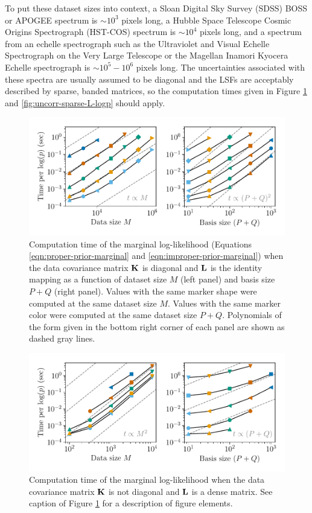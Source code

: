 \documentclass[trackchanges]{aastex62}
\newcommand{\vx}[1]{{\bf {#1}}}
\begin{document}
To put these dataset sizes into context, a Sloan Digital Sky Survey (SDSS) BOSS or APOGEE spectrum is $\sim 10^3$ pixels long, a Hubble Space Telescope Cosmic Origins Spectrograph (HST-COS) spectrum is $\sim 10^4$ pixels long, and a spectrum from an echelle spectrograph such as the Ultraviolet and Visual Echelle Spectrograph on the Very Large Telescope or the Magellan Inamori Kyocera Echelle spectrograph is $\sim 10^5 - 10^6$ pixels long.
The uncertainties associated with these spectra are usually assumed to be diagonal and the LSFs are acceptably described by sparse, banded matrices, so the computation times given in Figure \ref{fig:uncorr-no-L-logp} and \ref{fig:uncorr-sparse-L-logp} should apply.

\begin{figure}
  \includegraphics{uncorr_no_L_scaling.pdf}
  \caption{Computation time of the marginal log-likelihood (Equations \ref{eqn:proper-prior-marginal} and \ref{eqn:improper-prior-marginal}) when the data covariance matrix $\vx{K}$ is diagonal and $\vx{L}$ is the identity mapping as a function of dataset size $M$ (left panel) and basis size $P+Q$ (right panel). Values with the same marker shape were computed at the same dataset size $M$. Values with the same marker color were computed at the same dataset size $P+Q$. Polynomials of the form given in the bottom right corner of each panel are shown as dashed gray lines.}
  \label{fig:uncorr-no-L-logp}
\end{figure}

\begin{figure}
  \includegraphics{corr_yes_L_scaling.pdf}
  \caption{Computation time of the marginal log-likelihood when the data covariance matrix $\vx{K}$ is not diagonal and $\vx{L}$ is a dense matrix. See caption of Figure \ref{fig:uncorr-no-L-logp} for a description of figure elements.}
  \label{fig:corr-yes-L-logp}
\end{figure}
\end{document}
